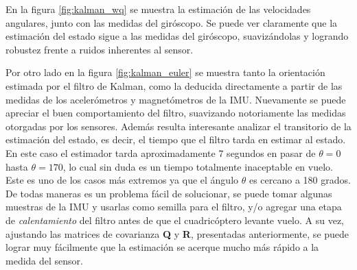 \documentclass[main]{subfiles}
\begin{document}
\begin{figure} [h!]
\centering
   \hspace{10pt}
  \caption{}
  \label{fig:posyvel}
\end{figure}

En la figura \ref{fig:kalman_wq} se muestra la estimación de las velocidades angulares, junto con las medidas del giróscopo. Se puede ver claramente que la estimación del estado sigue a las medidas del giróscopo, suavizándolas y logrando robustez frente a ruidos inherentes al sensor.

Por otro lado en la figura \ref{fig:kalman_euler} se muestra tanto la orientación estimada por el filtro de Kalman, como la deducida directamente a partir de las medidas de los acelerómetros y magnetómetros de la IMU. Nuevamente se puede apreciar el buen comportamiento del filtro, suavizando notoriamente las medidas otorgadas por los sensores. Además resulta interesante analizar el transitorio de la estimación del estado, es decir, el tiempo que el filtro tarda en estimar al estado. En este caso el estimador tarda aproximadamente 7 segundos en pasar de $\theta = 0$ hasta $\theta = 170$, lo cual sin duda es un tiempo totalmente inaceptable en vuelo. Este es uno de los casos más extremos ya que el ángulo $\theta$ es cercano a 180 grados. De todas maneras es un problema fácil de solucionar, se puede tomar algunas muestras de la IMU y usarlas como semilla para el filtro, y/o agregar una etapa de \emph{calentamiento} del filtro antes de que el cuadricóptero levante vuelo. A su vez, ajustando las matrices de covarianza \textbf{Q} y \textbf{R}, presentadas anteriormente, se puede lograr muy fácilmente que la estimación se acerque mucho más rápido a la medida del sensor.\\
\end{document}
